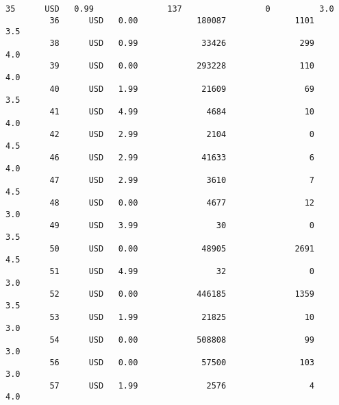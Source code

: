 \documentclass[11pt]{article}
\begin{document}
\begin{Verbatim}[commandchars=\\\{\}]
         35      USD   0.99               137                 0          3.0   
         36      USD   0.00            180087              1101          3.5   
         38      USD   0.99             33426               299          4.0   
         39      USD   0.00            293228               110          4.0   
         40      USD   1.99             21609                69          3.5   
         41      USD   4.99              4684                10          4.0   
         42      USD   2.99              2104                 0          4.5   
         46      USD   2.99             41633                 6          4.0   
         47      USD   2.99              3610                 7          4.5   
         48      USD   0.00              4677                12          3.0   
         49      USD   3.99                30                 0          3.5   
         50      USD   0.00             48905              2691          4.5   
         51      USD   4.99                32                 0          3.0   
         52      USD   0.00            446185              1359          3.5   
         53      USD   1.99             21825                10          3.0   
         54      USD   0.00            508808                99          3.0   
         56      USD   0.00             57500               103          3.0   
         57      USD   1.99              2576                 4          4.0   
         

\end{Verbatim}
\end{document}
